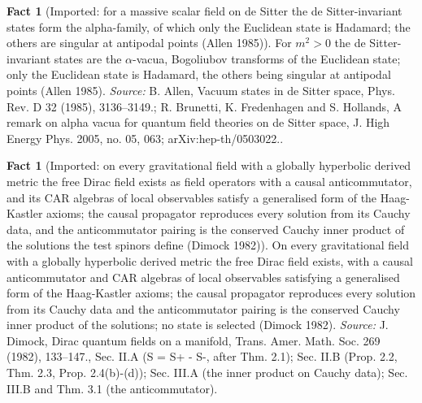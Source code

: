 \documentclass[11pt]{article}
\theoremstyle{definition}
\newtheorem{fact}[theorem]{Fact}
\theoremstyle{plain}
\begin{document}
\begin{fact}[Imported: for a massive scalar field on de Sitter the de Sitter-invariant states form the alpha-family, of which only the Euclidean state is Hadamard; the others are singular at antipodal points (Allen 1985)]\label{c:synthesis.imported-de-sitter-invariant-hadamard-state-unique}
For $m^{2} > 0$ the de Sitter-invariant states are the $\alpha$-vacua, Bogoliubov transforms of the Euclidean state; only the Euclidean state is Hadamard, the others being singular at antipodal points (Allen 1985).
\emph{Source:} B. Allen, Vacuum states in de Sitter space, Phys. Rev. D 32 (1985), 3136--3149.; R. Brunetti, K. Fredenhagen and S. Hollands, A remark on alpha vacua for quantum field theories on de Sitter space, J. High Energy Phys. 2005, no. 05, 063; arXiv:hep-th/0503022..
\end{fact}

\begin{fact}[Imported: on every gravitational field with a globally hyperbolic derived metric the free Dirac field exists as field operators with a causal anticommutator, and its CAR algebras of local observables satisfy a generalised form of the Haag-Kastler axioms; the causal propagator reproduces every solution from its Cauchy data, and the anticommutator pairing is the conserved Cauchy inner product of the solutions the test spinors define (Dimock 1982)]\label{c:synthesis.imported-dimock-dirac-car-algebra-on-a-gravitational-field}
On every gravitational field with a globally hyperbolic derived metric the free Dirac field exists, with a causal anticommutator and CAR algebras of local observables satisfying a generalised form of the Haag-Kastler axioms; the causal propagator reproduces every solution from its Cauchy data and the anticommutator pairing is the conserved Cauchy inner product of the solutions; no state is selected (Dimock 1982).
\emph{Source:} J. Dimock, Dirac quantum fields on a manifold, Trans. Amer. Math. Soc. 269 (1982), 133--147., Sec. II.A (S = S+ - S-, after Thm. 2.1); Sec. II.B (Prop. 2.2, Thm. 2.3, Prop. 2.4(b)-(d)); Sec. III.A (the inner product on Cauchy data); Sec. III.B and Thm. 3.1 (the anticommutator).
\end{fact}
\end{document}
